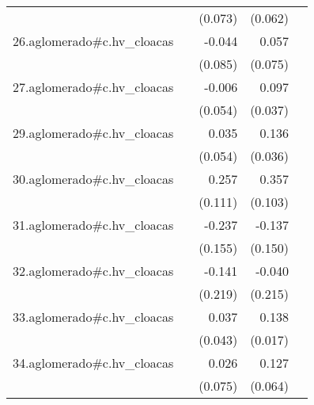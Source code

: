 {\begin{longtable}{l*{4}{D{.}{.}{-1}}}
            &                     &     (0.073)         &     (0.062)         &                     \\
\addlinespace
26.aglomerado#c.hv\_cloacas&                     &      -0.044         &       0.057         &                     \\
            &                     &     (0.085)         &     (0.075)         &                     \\
\addlinespace
27.aglomerado#c.hv\_cloacas&                     &      -0.006         &       0.097\sym{**} &                     \\
            &                     &     (0.054)         &     (0.037)         &                     \\
\addlinespace
29.aglomerado#c.hv\_cloacas&                     &       0.035         &       0.136\sym{***}&                     \\
            &                     &     (0.054)         &     (0.036)         &                     \\
\addlinespace
30.aglomerado#c.hv\_cloacas&                     &       0.257\sym{*}  &       0.357\sym{***}&                     \\
            &                     &     (0.111)         &     (0.103)         &                     \\
\addlinespace
31.aglomerado#c.hv\_cloacas&                     &      -0.237         &      -0.137         &                     \\
            &                     &     (0.155)         &     (0.150)         &                     \\
\addlinespace
32.aglomerado#c.hv\_cloacas&                     &      -0.141         &      -0.040         &                     \\
            &                     &     (0.219)         &     (0.215)         &                     \\
\addlinespace
33.aglomerado#c.hv\_cloacas&                     &       0.037         &       0.138\sym{***}&                     \\
            &                     &     (0.043)         &     (0.017)         &                     \\
\addlinespace
34.aglomerado#c.hv\_cloacas&                     &       0.026         &       0.127\sym{*}  &                     \\
            &                     &     (0.075)         &     (0.064)         &                     \\

\end{longtable}}
